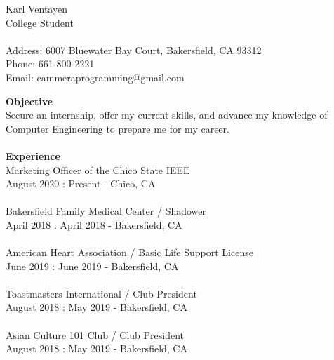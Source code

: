 \documentclass[12pt, letterpaper]{article}                %
\begin{document}
\begin{multicols}{2}
Karl Ventayen\\
College Student\\
\columnbreak
\\
Address: 6007 Bluewater Bay Court, Bakersfield, CA 93312\\
Phone: 661-800-2221\\
Email: cammeraprogramming@gmail.com
\end{multicols}
\textbf{Objective}\\
Secure an internship, offer my current skills, and advance my knowledge of Computer Engineering to prepare me for my career.\\
\\
\textbf{Experience}\\
Marketing Officer of the Chico State IEEE\\
August 2020 : Present - Chico, CA\\
\\
Bakersfield Family Medical Center / Shadower\\
April 2018 : April 2018 - Bakersfield, CA\\
\\
American Heart Association / Basic Life Support License\\
June 2019 : June 2019 - Bakersfield, CA\\
\\
Toastmasters International / Club President\\
August 2018 : May 2019 - Bakersfield, CA\\
\\
Asian Culture 101 Club / Club President\\
August 2018 : May 2019 - Bakersfield, CA\\
\end{document}
